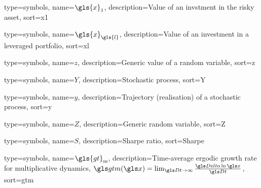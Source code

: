 {
  type={symbols}, 
  name={\ensuremath{\gls{x}_1}},
  description={Value of an invstment in the risky asset},
  sort=x1
}

{
  type={symbols}, 
  name={\ensuremath{\gls{x}_{\gls{l}}}},
  description={Value of an investment in a leveraged portfolio},
  sort=xl
}

{
  type={symbols}, 
  name={\ensuremath{z}},
  description={Generic value of a random variable},
  sort=z
}

{
  type={symbols}, 
  name={\ensuremath{Y}},
  description={Stochastic process},
  sort=Y
}

{
  type={symbols}, 
  name={\ensuremath{y}},
  description={Trajectory (realisation) of a stochastic process},
  sort=y
}

{
  type={symbols}, 
  name={\ensuremath{Z}},
  description={Generic random variable},
  sort=Z
}


{
  type={symbols}, 
  name={\ensuremath{S}},
  description={Sharpe ratio},
  sort=Sharpe
}

{
  type={symbols}, 
  name={\ensuremath{\gls{gt}_\text{m}}},
  description={Time-average ergodic growth rate for multiplicative dynamics, $\gtm(\x)=\lim_{\Dt\to\infty}\frac{\D \ln \x}{\Dt}$},
  sort=gtm
}
